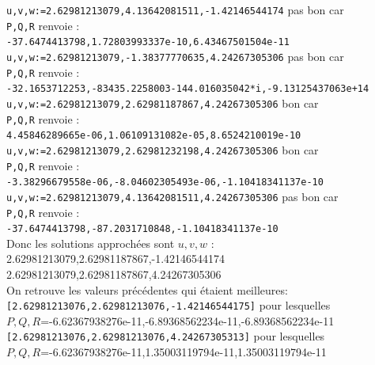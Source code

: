 \documentclass[a4paper,11pt]{book}
\begin{document}
{\tt u,v,w:=2.62981213079,4.13642081511,-1.42146544174} pas bon car\\
{\tt P,Q,R} renvoie :\\
{\tt -37.6474413798,1.72803993337e-10,6.43467501504e-11}\\

{\tt u,v,w:=2.62981213079,-1.38377770635,4.24267305306} pas bon car\\
{\tt P,Q,R} renvoie :\\
{\tt -32.1653712253,-83435.2258003-144.016035042*i,-9.13125437063e+14}\\

{\tt u,v,w:=2.62981213079,2.62981187867,4.24267305306} bon car\\
{\tt P,Q,R} renvoie :\\
{\tt 4.45846289665e-06,1.06109131082e-05,8.6524210019e-10}\\

{\tt u,v,w:=2.62981213079,2.62981232198,4.24267305306} bon car\\
{\tt P,Q,R} renvoie :\\
{\tt -3.38296679558e-06,-8.04602305493e-06,-1.10418341137e-10}\\

{\tt u,v,w:=2.62981213079,4.13642081511,4.24267305306} pas bon car\\
{\tt P,Q,R} renvoie :\\
{\tt -37.6474413798,-87.2031710848,-1.10418341137e-10}\\
Donc les solutions approch\'ees sont $u,v,w$ :\\
2.62981213079,2.62981187867,-1.42146544174\\
2.62981213079,2.62981187867,4.24267305306\\
On retrouve les valeurs pr\'ec\'edentes qui \'etaient meilleures:\\
{\tt [2.62981213076,2.62981213076,-1.42146544175]} pour lesquelles\\
$P,Q,R$=-6.62367938276e-11,-6.89368562234e-11,-6.89368562234e-11\\
{\tt [2.62981213076,2.62981213076,4.24267305313]} pour lesquelles\\
$P,Q,R$=-6.62367938276e-11,1.35003119794e-11,1.35003119794e-11
\end{document}
